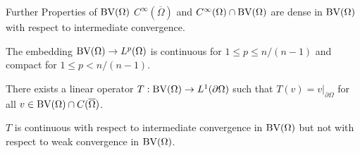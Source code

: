 \begin{frame}{Further Properties of $\textup{BV}(\Omega)$}
  $C^\infty(\overline\Omega)$ and $C^\infty(\Omega)\cap\textup{BV}(\Omega)$ are dense
  in $\textup{BV}(\Omega)$ with respect to intermediate convergence.
  
  \pause
  \bigskip

  The embedding $\textup{BV}(\Omega)\to L^p(\Omega)$ is continuous for
  $1\leq p\leq n/(n-1)$ and compact for $1\leq p< n/(n-1)$.
  
  \pause
  \bigskip

  There exists a linear operator $T:\textup{BV}(\Omega)\to L^1(\partial\Omega)$
  such that $T(v) = v|_{\partial\Omega}$ for all $v\in\textup{BV}(\Omega)\cap
  C(\overline\Omega)$.

  $T$ is continuous with respect to intermediate convergence in $\textup{BV}(\Omega)$
  but not with respect to weak convergence in $\textup{BV}(\Omega)$. 
\end{frame}


